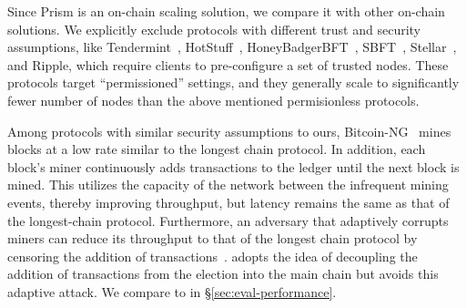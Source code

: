Since Prism is an on-chain scaling solution, we compare it with other on-chain solutions. 
We explicitly exclude protocols with different trust and security assumptions, like   Tendermint~\cite{kwon2014tendermint},  HotStuff~\cite{yin2019hotstuff}, HoneyBadgerBFT~\cite{miller2016honey}, SBFT~\cite{gueta1804sbft}, Stellar~\cite{stellarsystem}, and Ripple\cite{cachin2017blockchain}, which require clients to pre-configure a set of trusted nodes. 
These protocols target ``permissioned'' settings, and they generally scale to significantly fewer number of nodes than the above mentioned permisionless protocols.



Among protocols with similar security assumptions to ours,  Bitcoin-NG~\cite{bitcoin-ng}  mines blocks  at a low rate similar to the longest chain protocol. In addition, each block's miner continuously adds transactions to the ledger until the next block is mined. This utilizes the capacity of the network between the infrequent mining events, thereby improving throughput, but latency remains the same as that of the longest-chain protocol. Furthermore,  an adversary that adaptively corrupts miners can reduce its throughput to that of the longest chain protocol by censoring the addition of transactions~\cite{parallel}. \prism adopts the idea of decoupling the addition of transactions from the election into the main chain but avoids this adaptive attack. We compare to \bng in \S\ref{sec:eval-performance}.

